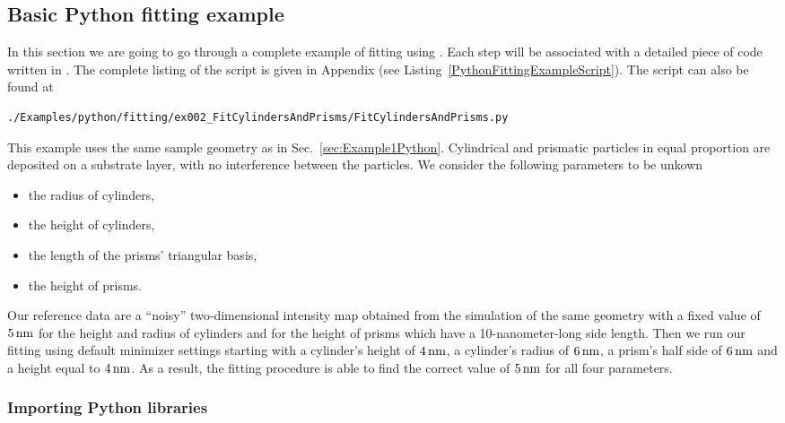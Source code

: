 \subsection{Basic Python fitting example} \label{sec:FittingExamples}

In this section we are going to go through a complete example of
fitting using \BornAgain. Each  step will be associated with a
detailed piece of code written in \Python.
The complete listing of
the script is given in Appendix (see Listing~\ref{PythonFittingExampleScript}).
The script can also be found at
\begin{lstlisting}[language=shell, style=commandline]
./Examples/python/fitting/ex002_FitCylindersAndPrisms/FitCylindersAndPrisms.py
\end{lstlisting}

\noindent
This example uses the same sample geometry as in Sec.~\ref{sec:Example1Python}.
Cylindrical and
prismatic particles in equal proportion are deposited on a substrate layer, with no interference
between the particles. We consider the following parameters to be unkown
\begin{itemize}
\item the radius of cylinders,
\item the height of cylinders,
\item the length of the prisms' triangular basis,
\item the height of prisms.
\end{itemize}

Our reference data are a ``noisy'' two-dimensional intensity
map obtained from the simulation of the same geometry with a fixed
value of $5\,{\rm nm}$ for the height and radius of cylinders and for the
height of prisms which have a 10-nanometer-long side length.
Then we run our fitting using default minimizer settings
starting with a cylinder's height
of $4\,{\rm nm}$, a cylinder's radius of $6\,{\rm nm}$,
a prism's half side of $6\,{\rm nm}$ and a height equal to $4\,{\rm nm}$.
As a result, the fitting procedure is able to find the correct value of $5\,{\rm nm}$
for all four parameters.


\subsubsection*{Importing Python libraries}

